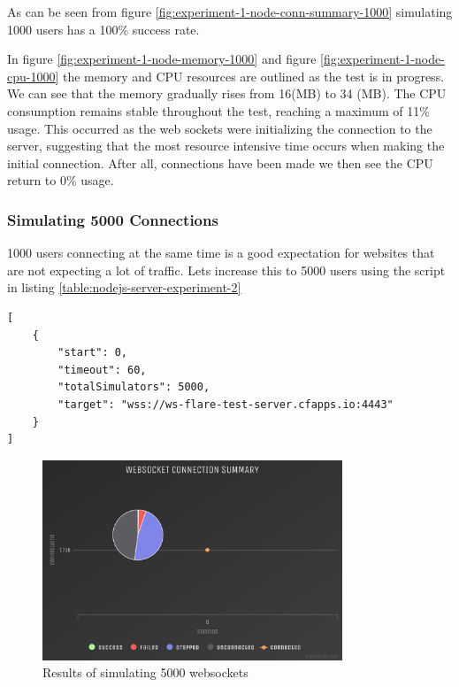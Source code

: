 As can be seen from figure \ref{fig:experiment-1-node-conn-summary-1000} simulating 1000 users has a 100\% success rate.

In figure \ref{fig:experiment-1-node-memory-1000} and figure \ref{fig:experiment-1-node-cpu-1000} the memory and CPU resources are outlined as the test is in progress. We can see that the memory gradually rises from 16(MB) to 34 (MB). The CPU consumption remains stable throughout the test, reaching a maximum of 11\% usage. This occurred as the web sockets were initializing the connection to the server, suggesting that the most resource intensive time occurs when making the initial connection. After all, connections have been made we then see the CPU return to 0\% usage. 

\subsubsection{Simulating 5000 Connections}

1000 users connecting at the same time is a good expectation for websites that are not expecting a lot of traffic. Lets increase this to 5000 users using the script in listing \ref{table:nodejs-server-experiment-2}

\begin{listing}[H]
    \caption{WS-Flare test script for 5000 users}
    \label{table:nodejs-server-experiment-2}
    \begin{verbatim}
[
    {
        "start": 0,
        "timeout": 60,
        "totalSimulators": 5000,
        "target": "wss://ws-flare-test-server.cfapps.io:4443"
    }
]
\end{verbatim}
\end{listing}

\begin{figure}[H]
  \centering
    \includegraphics[width=0.8\textwidth]{figures/experiments/experiment-1/node-js/conn-summary-5000.png}
    \caption{Results of simulating 5000 websockets}
    \label{fig:experiment-1-conn-summary-5000}
\end{figure}

